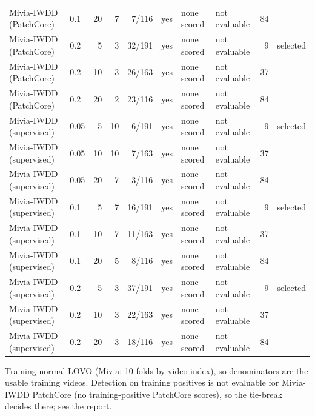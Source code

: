 \begin{table}[t]
{\begin{tabular}{llrrrlllrl}
Mivia-IWDD (PatchCore) & 0.1 & 20 & 7 & 7/116 & yes & none scored & not evaluable & 84 &  \\
Mivia-IWDD (PatchCore) & 0.2 & 5 & 3 & 32/191 & yes & none scored & not evaluable & 9 & selected \\
Mivia-IWDD (PatchCore) & 0.2 & 10 & 3 & 26/163 & yes & none scored & not evaluable & 37 &  \\
Mivia-IWDD (PatchCore) & 0.2 & 20 & 2 & 23/116 & yes & none scored & not evaluable & 84 &  \\
Mivia-IWDD (supervised) & 0.05 & 5 & 10 & 6/191 & yes & none scored & not evaluable & 9 & selected \\
Mivia-IWDD (supervised) & 0.05 & 10 & 10 & 7/163 & yes & none scored & not evaluable & 37 &  \\
Mivia-IWDD (supervised) & 0.05 & 20 & 7 & 3/116 & yes & none scored & not evaluable & 84 &  \\
Mivia-IWDD (supervised) & 0.1 & 5 & 7 & 16/191 & yes & none scored & not evaluable & 9 & selected \\
Mivia-IWDD (supervised) & 0.1 & 10 & 7 & 11/163 & yes & none scored & not evaluable & 37 &  \\
Mivia-IWDD (supervised) & 0.1 & 20 & 5 & 8/116 & yes & none scored & not evaluable & 84 &  \\
Mivia-IWDD (supervised) & 0.2 & 5 & 3 & 37/191 & yes & none scored & not evaluable & 9 & selected \\
Mivia-IWDD (supervised) & 0.2 & 10 & 3 & 22/163 & yes & none scored & not evaluable & 37 &  \\
Mivia-IWDD (supervised) & 0.2 & 20 & 3 & 18/116 & yes & none scored & not evaluable & 84 &  \\
\bottomrule
\end{tabular}}
\begin{minipage}{\linewidth}\vspace{2pt}\footnotesize Training-normal LOVO (Mivia: 10 folds by video index), so denominators are the usable training videos. Detection on training positives is not evaluable for Mivia-IWDD PatchCore (no training-positive PatchCore scores), so the tie-break decides there; see the report.\end{minipage}
\end{table}
